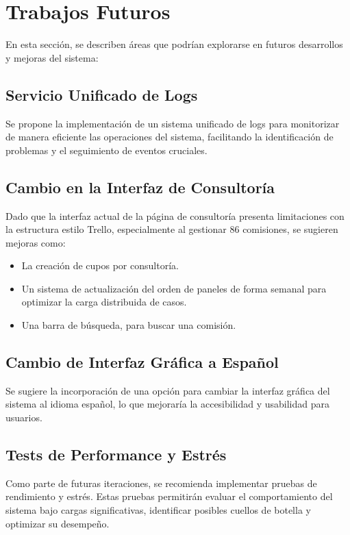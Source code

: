 \chapter{Trabajos Futuros}

En esta sección, se describen áreas que podrían explorarse en futuros desarrollos y mejoras del sistema:

\section{Servicio Unificado de Logs}

Se propone la implementación de un sistema unificado de logs para monitorizar de manera eficiente las operaciones del sistema, facilitando la identificación de problemas y el seguimiento de eventos cruciales.

\section{Cambio en la Interfaz de Consultoría}

Dado que la interfaz actual de la página de consultoría presenta limitaciones con la estructura estilo Trello, especialmente al gestionar 86 comisiones, se sugieren mejoras como:

\begin{itemize}
\item La creación de cupos por consultoría.
\item Un sistema de actualización del orden de paneles de forma semanal para optimizar la carga distribuida de casos.
\item  Una barra de búsqueda, para buscar una comisión.
\end{itemize}

\section{Cambio de Interfaz Gráfica a Español}

Se sugiere la incorporación de una opción para cambiar la interfaz gráfica del sistema al idioma español, lo que mejoraría la accesibilidad y usabilidad para usuarios.

\section{Tests de Performance y Estrés}

Como parte de futuras iteraciones, se recomienda implementar pruebas de rendimiento y estrés. Estas pruebas permitirán evaluar el comportamiento del sistema bajo cargas significativas, identificar posibles cuellos de botella y optimizar su desempeño.

